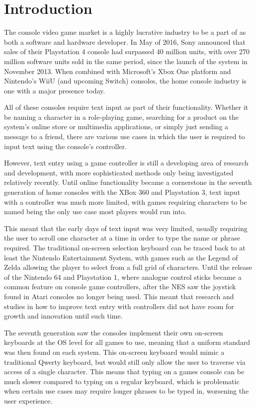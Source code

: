 \documentclass[requirements.tex]{subfiles}
\begin{document}
\section{Introduction} %
\label{sec:introduction}
The console video game market is a highly lucrative industry to be a part of as
both a software and hardware developer. In May of 2016, Sony announced that
sales of their Playstation 4 console had surpassed 40 million units, with over
270 million software units sold in the same period, since the launch of the
system in November 2013\cite{sony}. When combined with Microsoft's Xbox One
platform and Nintendo's WiiU (and upcoming Switch) consoles, the home console
industry is one with a major presence today.

All of these consoles require text input as part of their functionality. Whether
it be naming a character in a role-playing game, searching for a product on the
system's online store or multimedia applications, or simply just sending a
message to a friend, there are various use cases in which the user is required
to input text using the console's controller.

However, text entry using a game controller is still a developing area of
research and development, with more sophisticated methods only being
investigated relatively recently. Until online functionality became a
cornerstone in the seventh generation of home consoles with the XBox 360 and
Playstation 3, text input with a controller was much more limited, with games
requiring characters to be named being the only use case most players would
run into. 

This meant that the early days of text input was very limited, usually requiring
the user to scroll one character at a time in order to type the name or phrase
required. The traditional on-screen selection keyboard can be traced back to
at least the Nintendo Entertainment System, with games such as the Legend of
Zelda allowing the player to select from a full grid of characters. Until the
release of the Nintendo 64 and Playstation 1, where analogue control sticks
became a common feature on console game controllers, after the NES saw the
joystick found in Atari consoles no longer being used. This meant that research
and studies in how to improve text entry with controllers did not have room for
growth and innovation until such time.

The seventh generation saw the consoles implement their own on-screen keyboards
at the OS level for all games to use, meaning that a uniform standard was then
found on each system. This on-screen keyboard would mimic a traditional Qwerty
keyboard, but would still only allow the user to traverse via access of a single
character. This means that typing on a games console can be much slower compared
to typing on a regular keyboard, which is problematic when certain use cases may
require longer phrases to be typed in, worsening the user experience.
\end{document}
